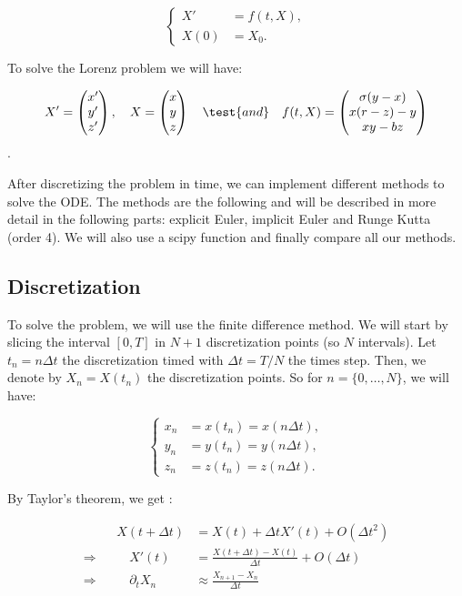 \documentclass[12pt]{article}
\begin{document}
	$$\left\{\begin{aligned}
		X'&=f(t,X), \\
		X(0)&=X_0.
	\end{aligned}\right.$$
	
	\noindent To solve the Lorenz problem we will have:
	
	$$X'=\begin{pmatrix}
		x' \\
		y' \\
		z'
	\end{pmatrix}, \quad X=\begin{pmatrix}
		x \\
		y \\
		z
	\end{pmatrix} \quad \test{and} \quad f(t,X)=\begin{pmatrix}
		\sigma(y-x) \\
		x(r-z)-y \\
		xy-bz
	\end{pmatrix}$$.
	
	\noindent After discretizing the problem in time, we can implement different methods to solve the ODE. The methods are the following and will be described in more detail in the following parts: explicit Euler, implicit Euler and Runge Kutta (order 4). We will also use a scipy function and finally compare all our methods.
	
	\subsection{Discretization}
	
	To solve the problem, we will use the finite difference method. We will start by slicing the interval $[0,T]$ in $N+1$ discretization points (so $N$ intervals). Let $t_n=n\Delta t$ the discretization timed with $\Delta t=T/N$ the times step. Then, we denote by $X_n=X(t_n)$ the discretization points. So for $n=\{0,\dots,N\}$, we will have:
	
	$$\left\{\begin{aligned} 
		x_n&=x(t_n)=x(n\Delta t), \\
		y_n&=y(t_n)=y(n\Delta t), \\
		z_n&=z(t_n)=z(n\Delta t).
	\end{aligned}\right.$$
	
	\noindent By Taylor's theorem, we get :
	
	$$\begin{aligned}
		&&X(t+\Delta t)&=X(t)+\Delta t X'(t) + O(\Delta t^2) \\
		\Rightarrow&& \quad X'(t)&=\frac{X(t+\Delta t)-X(t)}{\Delta t} + O(\Delta t) \\
		\Rightarrow&& \quad \partial_t X_n&\approx\frac{X_{n+1}-X_n}{\Delta t} \\
	\end{aligned}
	$$	
	
\end{document}
